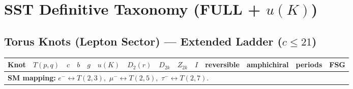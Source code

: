 \documentclass[a4paper,11pt]{article}
\begin{document}
\section*{SST Definitive Taxonomy (FULL + $u(K)$)}
\subsection*{Torus Knots (Lepton Sector) — Extended Ladder ($c\le 21$)}
\begin{longtable}{lccccccccccccc}
\toprule
Knot & $T(p,q)$ & $c$ & $b$ & $g$ & $u(K)$ & $D_2(r)$ & $D_{2k}$ & $Z_{2k}$ & $I$ & reversible & amphichiral & periods & FSG \\
\midrule
\multicolumn{14}{l}{\textbf{SM mapping:} $e^- \leftrightarrow T(2,3)$,\ $\mu^- \leftrightarrow T(2,5)$,\ $\tau^- \leftrightarrow T(2,7)$.} \\ \hline


\end{longtable}
\end{document}

